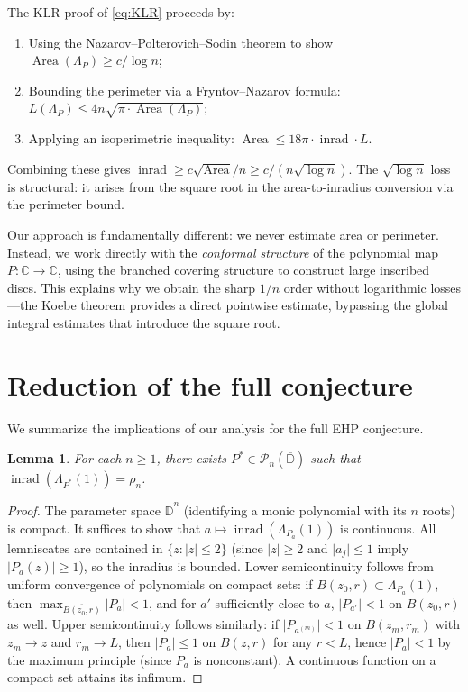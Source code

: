 \documentclass[11pt,a4paper]{amsart}
\newtheorem{lemma}[theorem]{Lemma}
\theoremstyle{definition}
\newcommand{\D}{\mathbb{D}}
\newcommand{\C}{\mathbb{C}}
\newcommand{\Pn}{\mathcal{P}_n}
\newcommand{\abs}[1]{\lvert #1 \rvert}
\newcommand{\inrad}{\operatorname{inrad}}
\begin{document}
The KLR proof of \eqref{eq:KLR} proceeds by:
\begin{enumerate}[(1)]
  \item Using the Nazarov--Polterovich--Sodin theorem to show
    $\operatorname{Area}(\Lambda_P) \geq c/\log n$;
  \item Bounding the perimeter via a Fryntov--Nazarov formula:
    $L(\Lambda_P) \leq 4n\sqrt{\pi \cdot \operatorname{Area}(\Lambda_P)}$;
  \item Applying an isoperimetric inequality:
    $\operatorname{Area} \leq 18\pi \cdot \inrad \cdot L$.
\end{enumerate}
Combining these gives $\inrad \geq c\sqrt{\operatorname{Area}}/n \geq c/(n\sqrt{\log n})$.
The $\sqrt{\log n}$ loss is structural: it arises from the square root
in the area-to-inradius conversion via the perimeter bound.

Our approach is fundamentally different: we never estimate area or
perimeter.  Instead, we work directly with the \emph{conformal structure}
of the polynomial map $P \colon \C \to \C$, using the branched covering
structure to construct large inscribed discs.  This explains why we obtain
the sharp $1/n$ order without logarithmic losses---the Koebe theorem
provides a direct pointwise estimate, bypassing the global integral
estimates that introduce the square root.

\section{Reduction of the full conjecture}

We summarize the implications of our analysis for the full EHP conjecture.

\begin{lemma}\label{lem:minimizer}
For each $n \geq 1$, there exists $P^* \in \Pn(\overline{\D})$ such that
$\inrad(\Lambda_{P^*}(1)) = \rho_n$.
\end{lemma}

\begin{proof}
The parameter space $\overline{\D}^n$ (identifying a monic polynomial
with its $n$ roots) is compact.  It suffices to show that
$a \mapsto \inrad(\Lambda_{P_a}(1))$ is continuous.
All lemniscates are contained in $\{z : \abs{z} \leq 2\}$
(since $\abs{z} \geq 2$ and $\abs{a_j} \leq 1$ imply
$\abs{P_a(z)} \geq 1$), so the inradius is bounded.
Lower semicontinuity follows from uniform convergence of polynomials
on compact sets: if $B(z_0,r) \subset \Lambda_{P_a}(1)$, then
$\max_{\overline{B(z_0,r)}}\abs{P_a} < 1$, and for $a'$ sufficiently
close to $a$, $\abs{P_{a'}} < 1$ on $\overline{B(z_0,r)}$ as well.
Upper semicontinuity follows similarly: if $\abs{P_{a^{(m)}}} < 1$
on $B(z_m, r_m)$ with $z_m \to z$ and $r_m \to L$, then
$\abs{P_a} \leq 1$ on $B(z,r)$ for any $r < L$, hence
$\abs{P_a} < 1$ by the maximum principle (since $P_a$ is nonconstant).
A continuous function on a compact set attains its infimum.
\end{proof}
\end{document}
